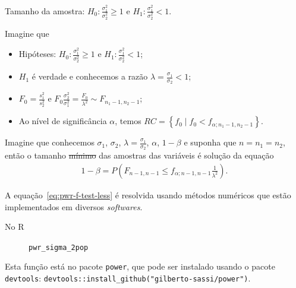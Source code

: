\documentclass[9pt]{beamer}
\begin{document}
\begin{frame}[fragile]{Tamanho da amostra: $H_0:\frac{\sigma_1^2}{\sigma_2^2} \geq 1$ e $H_1:\frac{\sigma_1^2}{\sigma_2^2} < 1$.}

\small

Imagine que
\begin{itemize}
\item Hipóteses: $H_0:\frac{\sigma_1^2}{\sigma_2^2} \geq 1$ e $H_1:\frac{\sigma_1^2}{\sigma_2^2} < 1$;
\item $H_1$ é verdade e conhecemos a razão $\lambda=\frac{\sigma_1}{\sigma_2} < 1$;
\item $F_0 = \frac{s_1^2}{s_2^2}$ e $F_0 \frac{\sigma_2^2}{\sigma_1^2} = \frac{F_0}{\lambda^2} \sim F_{n_1-1, n_2-1}$;
\item Ao nível de significância $\alpha$, temos $RC = \left\{ f_0 \mid f_0 < f_{\alpha; n_1-1, n_2-1}  \right\}$.
\end{itemize}
\vfill


Imagine que conhecemos $\sigma_1$, $\sigma_2$, $\lambda = \frac{\sigma_1}{\sigma_2}$, $\alpha$, $1-\beta$ e suponha que $n=n_1=n_2$, então o tamanho \sout{mínimo} das amostras das variáveis é solução da equação
\begin{align}\label{eq:pwr-f-test-less}
1-\beta=P \left(F_{n-1, n-1} \leq f_{\alpha; n-1, n-1} \frac{1}{\lambda^2} \right).
\end{align}

A equação~\eqref{eq:pwr-f-test-less} é resolvida usando métodos numéricos que estão implementados em diversos \textit{softwares}.
\begin{description}
	\item[No R] \lstinline|pwr_sigma_2pop|
\end{description}
Esta função está no pacote \lstinline|power|, que pode ser instalado usando o pacote \lstinline|devtools|: \lstinline|devtools::install_github("gilberto-sassi/power")|.

\normalsize
\end{frame}
\end{document}
